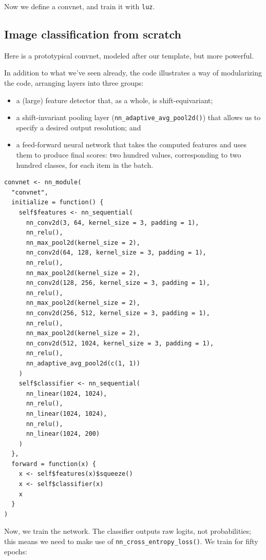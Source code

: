 \documentclass[
  letterpaper,
]{krantz}
\begin{document}
Now we define a convnet, and train it with \texttt{luz}.

\hypertarget{image-classification-from-scratch}{%
\subsection{Image classification from
scratch}\label{image-classification-from-scratch}}

Here is a prototypical convnet, modeled after our template, but more
powerful.

In addition to what we've seen already, the code illustrates a way of
modularizing the code, arranging layers into three groups:

\begin{itemize}
\item
  a (large) feature detector that, as a whole, is shift-equivariant;
\item
  a shift-invariant pooling layer (\texttt{nn\_adaptive\_avg\_pool2d()})
  that allows us to specify a desired output resolution; and
\item
  a feed-forward neural network that takes the computed features and
  uses them to produce final scores: two hundred values, corresponding
  to two hundred classes, for each item in the batch.
\end{itemize}

\begin{verbatim}
convnet <- nn_module(
  "convnet",
  initialize = function() {
    self$features <- nn_sequential(
      nn_conv2d(3, 64, kernel_size = 3, padding = 1),
      nn_relu(),
      nn_max_pool2d(kernel_size = 2),
      nn_conv2d(64, 128, kernel_size = 3, padding = 1),
      nn_relu(),
      nn_max_pool2d(kernel_size = 2),
      nn_conv2d(128, 256, kernel_size = 3, padding = 1),
      nn_relu(),
      nn_max_pool2d(kernel_size = 2),
      nn_conv2d(256, 512, kernel_size = 3, padding = 1),
      nn_relu(),
      nn_max_pool2d(kernel_size = 2),
      nn_conv2d(512, 1024, kernel_size = 3, padding = 1),
      nn_relu(),
      nn_adaptive_avg_pool2d(c(1, 1))
    )
    self$classifier <- nn_sequential(
      nn_linear(1024, 1024),
      nn_relu(),
      nn_linear(1024, 1024),
      nn_relu(),
      nn_linear(1024, 200)
    )
  },
  forward = function(x) {
    x <- self$features(x)$squeeze()
    x <- self$classifier(x)
    x
  }
)
\end{verbatim}

Now, we train the network. The classifier outputs raw logits, not
probabilities; this means we need to make use of
\texttt{nn\_cross\_entropy\_loss()}. We train for fifty epochs:
\end{document}
